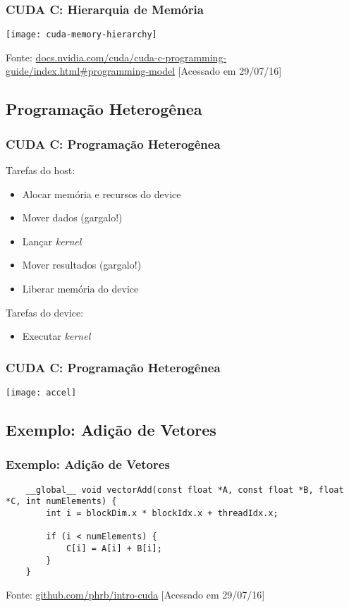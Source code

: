 \documentclass[10pt, compress, aspectratio=43, xcolor={table,usenames,dvipsnames}]{beamer}
\begin{document}
\begin{frame}
    \frametitle{CUDA C: Hierarquia de Memória}
    \begin{center}
        \texttt{[image: cuda-memory-hierarchy]}
    \end{center}

    \vfill

    \begin{center}
        \tiny{Fonte: \url{docs.nvidia.com/cuda/cuda-c-programming-guide/index.html\#programming-model} [Acessado em 29/07/16]}
    \end{center}
\end{frame}

\subsection{Programação Heterogênea}

\begin{frame}
    \frametitle{CUDA C: Programação Heterogênea}
    Tarefas do \alert{host}:
    \begin{itemize}
        \item Alocar memória e recursos do \alert{device}
        \item Mover \alert{dados} (\alert{gargalo!})
        \item Lançar \textit{kernel}
        \item Mover \alert{resultados} (\alert{gargalo!})
        \item Liberar memória do \alert{device}
    \end{itemize}
    Tarefas do \alert{device}:
    \begin{itemize}
        \item Executar \textit{kernel}
    \end{itemize}
\end{frame}

\begin{frame}
    \frametitle{CUDA C: Programação Heterogênea}
    \centering
    \texttt{[image: accel]}
\end{frame}

\subsection{Exemplo: Adição de Vetores}

\begin{frame}[fragile]
    \frametitle{Exemplo: Adição de Vetores}
    \begin{verbatim}
    __global__ void vectorAdd(const float *A, const float *B, float *C, int numElements) {
        int i = blockDim.x * blockIdx.x + threadIdx.x;

        if (i < numElements) {
            C[i] = A[i] + B[i];
        }
    }
    \end{verbatim}

    \vfill

    \begin{center}
        \tiny{Fonte: \url{github.com/phrb/intro-cuda} [Acessado em 29/07/16]}
    \end{center}
\end{frame}
\end{document}
